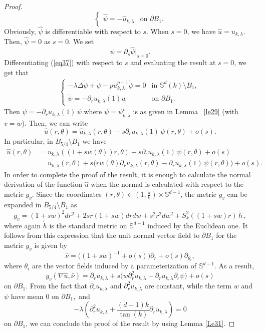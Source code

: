 \documentclass[reqno]{amsart}
\numberwithin{equation}{section}
\newenvironment{key words}{\textbf{Keywords}\mbox{  }}{ }
\begin{document}
\begin{proof}
\begin{equation}
\begin{cases}
      \hat{\psi}=-\hat{u}_{k,\lambda}  &\mbox{on $\partial B_1$}.
      \end{cases}
    \end{equation}
 Obviously, $\hat{\psi}$ is differentiable with respect to $s$. When $s=0$, we have $\hat{u}=u_{k,\lambda}.$ Then, $\hat{\psi}=0$ as $s=0.$ We set
  \[\dot{\psi}=\partial_{s}\hat{\psi}|_{s=0}.\]
 Differentiating (\ref{eq37}) with respect to $s$ and evaluating the result at $s=0$, we get that
  \begin{align*}
     \begin{cases}
     -\lambda\Delta\dot{\psi}+\dot{\psi}-pu_{k,\lambda}^{p-1}\dot{\psi}=0  &\mbox{in $\mathbb{S}^{d}(k)\setminus B_{1}$, }\\
      \dot{\psi}=-\partial_{r}u_{k,\lambda}(1) w  &\mbox{on $\partial B_1$.}
  \end{cases}
    \end{align*}
  Then $\dot{\psi} = -\partial_{r}u_{k,\lambda}(1)\, \psi$ where $\psi=\psi_{k, \lambda}^v$ is as given in Lemma ~\ref{le29} (with $v=w$). Then, we can write
     \[\hat{u}(r,\theta)=\hat{u}_{k,\lambda}(r,\theta)-s\partial_{r}u_{k,\lambda}(1)\, \psi(r,\theta)+o(s).\]
    In particular, in $B_{5/4}\setminus B_{1}$ we have
   \begin{align*}
   \hat{u}(r,\theta)&=u_{k,\lambda}((1+sw(\theta))r,\theta)-s\partial_{r}u_{k,\lambda}(1)\, \psi(r,\theta)+o(s)\\
         &=u_{k,\lambda}(r,\theta)+s\big(rw(\theta)\partial_{r}u_{k,\lambda}(r,\theta)-\partial_{r}u_{k,\lambda}(1)\, \psi(r,\theta)\big)+o(s).
         \end{align*}
In order to complete the proof of the result, it is enough to calculate the normal derivation of the function $\hat{u}$ when the normal is calculated with respect to the metric $g_{v}$. Since the coordinates $(r,\theta)\in \left(1,\frac{\pi}{k}\right)\times \mathbb{S}^{d-1}$, the metric $g_{v}$ can be expanded in $B_{5/4}\setminus B_{1}$ as
         \[g_{v}=(1+sw)^{2}dr^{2}+2sr(1+sw)drdw+s^{2}r^{2}dw^{2}+S_{k}^{2}((1+sw)r)\, \mathring{h}\,,\]
         where again $\mathring{h}$ is the standard metric on $\mathbb{S}^{d-1}$ induced by the Euclidean one.
It follows from this expression that the unit normal vector field to $\partial B_1$ for the metric $g_{v}$ is given by
          \[\hat{\nu}=\big((1+sw)^{-1}+o(s)\big)\partial_{r}+o(s)\partial_{\theta_{i}},\]
          where $\theta_{i}$ are the vector fields induced by a parameterization of $\mathbb{S}^{d-1}$. As a result,
   \[g_{v}(\nabla\hat{u},\hat{\nu})=\partial_{r}u_{k,\lambda}+s\big(w\partial_{r}^{2}u_{k,\lambda}-\partial_{r}u_{k,\lambda}\partial_{r}\psi\big)+o(s)\]
   on $\partial B_1$. From the fact that $\partial_{r}u_{k,\lambda}$ and $\partial_{r}^{2}u_{k,\lambda}$ are constant, while the term $w$ and $\psi$ have mean $0$ on $\partial B_1,$ and
   \[-\lambda\left(\partial_{r}^{2}u_{k,\lambda}+\frac{(d-1)k}{\tan(k)}\partial_{r}u_{k,\lambda}\right)=0\] on $\partial B_1$,
   we can conclude the proof of the result by using Lemma \ref{Le31}.
  \end{proof}
\end{document}
